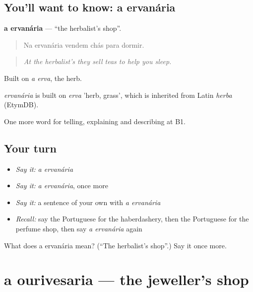 \subsection*{You'll want to know: a ervanária}
\textbf{a ervanária} — \textquotedblleft{}the herbalist's shop\textquotedblright{}.

\begin{quote}
Na ervanária vendem chás para dormir.
\end{quote}

\begin{quote}
\emph{At the herbalist's they sell teas to help you sleep.}
\end{quote}

Built on \emph{a erva}, the herb.

\begin{cousinweb}
\emph{ervanária} is built on \emph{erva} 'herb, grass', which is inherited from Latin \emph{herba} (EtymDB).
\end{cousinweb}

\begin{grammarlens}[title={What you've built}]
One more word for telling, explaining and describing at B1.
\end{grammarlens}

\subsection*{Your turn}
\begin{itemize}
\raggedright
  \item \emph{Say it:} \emph{a ervanária}
  \item \emph{Say it:} \emph{a ervanária}, once more
  \item \emph{Say it:} a sentence of your own with \emph{a ervanária}
  \item \emph{Recall:} say the Portuguese for the haberdashery, then the Portuguese for the perfume shop, then say \emph{a ervanária} again
\end{itemize}

\begin{tcolorbox}[breakable,colback=teal!4,colframe=teal!35!black,title={Before you move on}]
What does a ervanária mean? (\textquotedblleft{}The herbalist's shop\textquotedblright{}.) Say it once more.
\end{tcolorbox}
\section[a ourivesaria]{a ourivesaria — the jeweller's shop}

